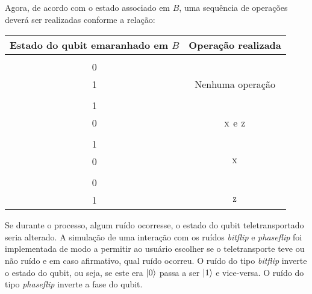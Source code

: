 Agora, de acordo com o estado associado em \(B\), uma sequência de operações deverá ser realizadas conforme a relação:
\begin{center}
  \begin{tabular}{cc}
    \toprule
    Estado do qubit emaranhado em \(B\) & Operação realizada \\
    \midrule
    \(\alpha \begin{bmatrix} 1 \\ 0 \end{bmatrix} + \beta \begin{bmatrix} 0 \\ 1 \end{bmatrix}\) & Nenhuma operação \\
    \(\alpha \begin{bmatrix} 0 \\ 1 \end{bmatrix} - \beta \begin{bmatrix} 1 \\ 0 \end{bmatrix}\) & \(\operatorname{\textsc{x}}\) e \(\operatorname{\textsc{z}}\) \\
    \(\alpha \begin{bmatrix} 0 \\ 1 \end{bmatrix} + \beta \begin{bmatrix} 1 \\ 0 \end{bmatrix}\) & \(\operatorname{\textsc{x}}\) \\
    \(\alpha \begin{bmatrix} 1 \\ 0 \end{bmatrix} - \beta \begin{bmatrix} 0 \\ 1 \end{bmatrix}\) & \(\operatorname{\textsc{z}}\) \\
    \bottomrule
  \end{tabular}
\end{center}

Se durante o processo, algum ruído ocorresse, o estado do qubit teletransportado seria alterado. A simulação de uma interação com os ruídos \emph{bitflip} e \emph{phaseflip} foi implementada de modo a permitir ao usuário escolher se o teletransporte teve ou não ruído e em caso afirmativo, qual ruído ocorreu. O ruído do tipo \emph{bitflip} inverte o estado do qubit, ou seja, se este era \(\ket{0}\) passa a ser \(\ket{1}\) e vice-versa. O ruído do tipo \emph{phaseflip} inverte a fase do qubit.

